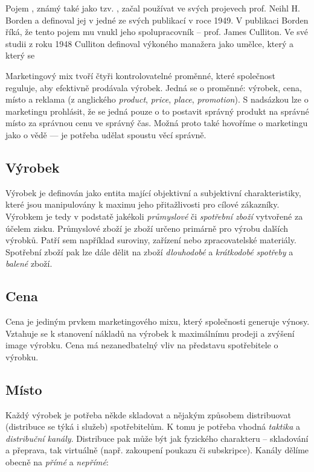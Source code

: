 Pojem , známý také jako tzv. , začal používat ve svých projevech prof. Neihl H. Borden a definoval jej v jedné ze svých publikací\cite{borden1964marketingmix} v roce 1949. V publikaci Borden říká, že tento pojem mu vnukl jeho spolupracovník -- prof. James Culliton. Ve své studii z roku 1948 Culliton definoval výkoného manažera jako umělce, který  a který se 

Marketingový mix tvoří čtyři kontrolovatelné proměnné, které společnost reguluje, aby efektivně prodávala výrobek. Jedná se o proměnné: výrobek, cena, místo a reklama (z anglického \textit{product}, \textit{price}, \textit{place}, \textit{promotion})\cite{clemente2004slovnikmarketingu}.
S nadsázkou lze o marketingu prohlásit, že se jedná pouze o to postavit správný produkt na správné místo za správnou cenu ve správný čas. Možná proto také hovoříme o marketingu jako o vědě --- je potřeba udělat spoustu věcí správně.


\subsection{Výrobek}
    
Výrobek je definován jako entita mající objektivní a subjektivní charakteristiky, které jsou manipulovány k maximu jeho přitažlivosti pro cílové zákazníky\cite{clemente2004slovnikmarketingu}. Výrobkem je tedy v podstatě jakékoli \textit{průmyslové} či \textit{spotřební zboží} vytvořené za účelem zisku.
Průmyslové zboží je zboží určeno primárně pro výrobu dalších výrobků. Patří sem například suroviny, zařízení nebo zpracovatelské materiály.
Spotřební zboží pak lze dále dělit na zboží \textit{dlouhodobé} a \textit{krátkodobé spotřeby} a \textit{balené} zboží.


\subsection{Cena}
Cena je jediným prvkem marketingového mixu, který společnosti generuje výnosy. Vztahuje se k stanovení nákladů na výrobek k maximálnímu prodeji a zvýšení image výrobku. Cena má nezanedbatelný vliv na představu spotřebitele o výrobku\cite{clemente2004slovnikmarketingu}.


\subsection{Místo}
Každý výrobek je potřeba někde skladovat a nějakým způsobem distribuovat (distribuce se týká i služeb) spotřebitelům. K tomu je potřeba vhodná \textit{taktika} a \textit{distribuční kanály}. Distribuce pak může být jak fyzického charakteru -- skladování a přeprava, tak virtuálně (např. zakoupení poukazu či subskripce). Kanály dělíme obecně na \textit{přímé} a \textit{nepřímé}:

